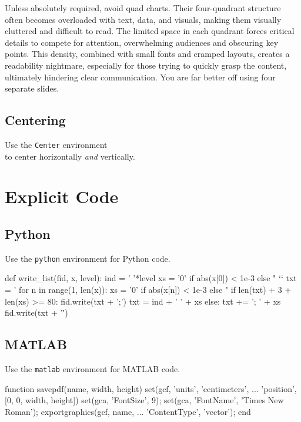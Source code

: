 \documentclass{afitdefense}
\begin{document}
{    \hspace{0.6cm}
    \parbox{0.8\textwidth}{\tiny%
    Unless absolutely required, avoid quad charts. Their four-quadrant structure often becomes overloaded with text, data, and visuals, making them visually cluttered and difficult to read. The limited space in each quadrant forces critical details to compete for attention, overwhelming audiences and obscuring key points. This density, combined with small fonts and cramped layouts, creates a readability nightmare, especially for those trying to quickly grasp the content, ultimately hindering clear communication. You are far better off using four separate slides.}
}

\section{Centering}

\begin{Center}
    \Large Use the \texttt{Center} environment \\
    to center horizontally \emph{and} vertically.
\end{Center}

\chapter{Explicit Code}

\section{Python}\onecolumn

Use the \verb|python| environment for Python code.
\begin{python}
def write_list(fid, x, level):
    ind = '  '*level
    xs = '0' if abs(x[0]) < 1e-3 else "%
`\HL`    txt = '\n%
    for n in range(1, len(x)):
        xs = '0' if abs(x[n]) < 1e-3 else "%
        if len(txt) + 3 + len(xs) >= 80:
            fid.write(txt + ';\n')
            txt = ind + '  ' + xs
        else:
            txt += '; ' + xs
    fid.write(txt + '\"')
\end{python}

\section{MATLAB}

Use the \verb|matlab| environment for MATLAB code.
\begin{matlab}
function savepdf(name, width, height)
    set(gcf, 'units', 'centimeters', ...
        'position', [0, 0, width, height])
    set(gca, 'FontSize', 9);
    set(gca, 'FontName', 'Times New Roman');
    exportgraphics(gcf, name, ...
        'ContentType', 'vector');
end
\end{matlab}
\end{document}
